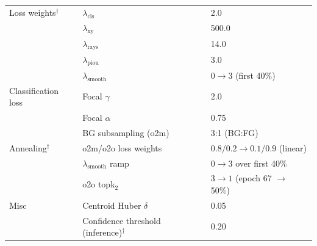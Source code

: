 \begin{longtable}{l l l}
	\hline
	Loss weights$^\dagger$ & $\lambda_{\text{cls}}$ & 2.0 \\
	               & $\lambda_{\text{xy}}$  & 500.0 \\
	               & $\lambda_{\text{rays}}$  & 14.0 \\
	               & $\lambda_{\text{piou}}$ & 3.0 \\
	               & $\lambda_{\text{smooth}}$ & $0 \to 3$ (first 40\%) \\
	\hline
	Classification loss & Focal $\gamma$   & 2.0 \\
	               & Focal $\alpha$         & 0.75 \\
	               & BG subsampling (o2m)   & 3:1 (BG:FG) \\
	\hline
	Annealing$^\dagger$ & o2m/o2o loss weights & $0.8/0.2 \to 0.1/0.9$ (linear) \\
	               & $\lambda_{\text{smooth}}$ ramp & $0 \to 3$ over first 40\% \\
	               & o2o topk$_2$           & $3 \to 1$ (epoch 67 $\to$ 50\%) \\
	\hline
	Misc           & Centroid Huber $\delta$ & 0.05 \\
	               & Confidence threshold (inference)$^\dagger$ & 0.20 \\
\end{longtable}
